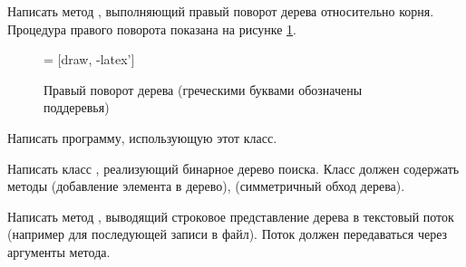 Написать метод , выполняющий правый поворот дерева
относительно корня. Процедура правого поворота показана на рисунке
\ref{fig:rotate}.

\begin{figure}
  \begin{centering}
     = [draw, -latex']
    \usetikzlibrary{shapes,positioning}
    \par
  \end{centering}

  \caption{Правый поворот дерева (греческими буквами обозначены
    поддеревья)\label{fig:rotate}}
\end{figure}

Написать программу, использующую этот класс.

\task Написать класс , реализующий бинарное дерево
поиска. Класс должен содержать методы  (добавление элемента в
дерево),  (симметричный обход дерева).

Написать метод , выводящий строковое представление дерева в
текстовый поток (например для последующей записи в файл). Поток должен
передаваться через аргументы метода.

